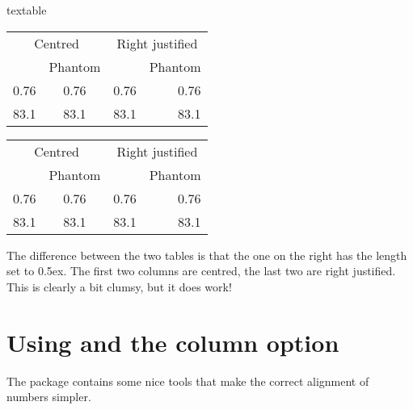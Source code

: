 \begin{tcblisting}{textable}
\centering
\begin{tabular}{cc | rr}
  \multicolumn{2}{c|}{Centred} &
  \multicolumn{2}{c}{Right justified} \\
  & Phantom & & Phantom\\
  \midrule
  0.76 & \phantom{0}0.76 & 0.76 & 0.76\\
  83.1 & 83.1\phantom{0} & 83.1 & 83.1\phantom{0}
\end{tabular}
\qquad
{\setlength{\extrarowheight}{0.5ex}
\centering
\begin{tabular}{cc|rr}
  \multicolumn{2}{c|}{Centred} &
  \multicolumn{2}{c}{Right justified} \\
  & Phantom & & Phantom\\
  \midrule
  0.76 & \phantom{0}0.76 & 0.76 & 0.76\\
  83.1 & 83.1\phantom{0} & 83.1 & 83.1\phantom{0}
\end{tabular}
}
\end{tcblisting}
\par\noindent
The difference between the two tables is that the one on the right
has the length  set to 0.5ex.
The first two columns are centred, the last two are right justified.
This is clearly a bit clumsy, but it does work!



\section{Using  and the  column option}%
\label{sec:table:siunitx}

The  package contains some nice tools that make the
correct alignment of numbers simpler. 

